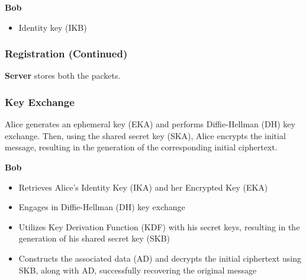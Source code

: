 \documentclass[11pt]{article}
\begin{document}
\textbf{Bob}
\begin{itemize}
    \item Identity key (IKB)
\end{itemize}

\subsubsection{Registration (Continued)}

\textbf{Server} stores both the packets.

\subsubsection{Key Exchange}

Alice generates an ephemeral key (EKA) and performs Diffie-Hellman (DH) key exchange. Then, using the shared secret key (SKA), Alice encrypts the initial message, resulting in the generation of the corresponding initial ciphertext.

\textbf{Bob}
\begin{itemize}
    \item Retrieves Alice’s Identity Key (IKA) and her Encrypted Key (EKA)
    \item Engages in Diffie-Hellman (DH) key exchange
    \item Utilizes Key Derivation Function (KDF) with his secret keys, resulting in the generation of his shared secret key (SKB)
    \item Constructs the associated data (AD) and decrypts the initial ciphertext using SKB, along with AD, successfully recovering the original message
\end{itemize}
\end{document}
